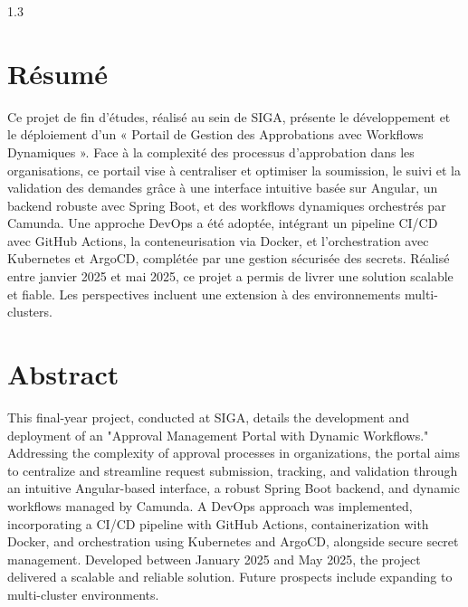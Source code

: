 \begin{samepage}
    
    \begin{spacing}{1.3}
    \vspace{-1.5cm}  %
    
    \section*{\Huge Résumé}
    
    \noindent
    \parbox{\textwidth}{
    Ce projet de fin d'études, réalisé au sein de SIGA, présente le développement et le déploiement d'un « Portail de Gestion des Approbations avec Workflows Dynamiques ». Face à la complexité des processus d'approbation dans les organisations, ce portail vise à centraliser et optimiser la soumission, le suivi et la validation des demandes grâce à une interface intuitive basée sur Angular, un backend robuste avec Spring Boot, et des workflows dynamiques orchestrés par Camunda. Une approche DevOps a été adoptée, intégrant un pipeline CI/CD avec GitHub Actions, la conteneurisation via Docker, et l'orchestration avec Kubernetes et ArgoCD, complétée par une gestion sécurisée des secrets. Réalisé entre janvier 2025 et mai 2025, ce projet a permis de livrer une solution scalable et fiable. Les perspectives incluent une extension à des environnements multi-clusters.
    }

    \vspace{1.4cm}  %
    
    \section*{\Huge Abstract}
    
    \noindent
    \parbox{\textwidth}{
    This final-year project, conducted at SIGA, details the development and deployment of an "Approval Management Portal with Dynamic Workflows." Addressing the complexity of approval processes in organizations, the portal aims to centralize and streamline request submission, tracking, and validation through an intuitive Angular-based interface, a robust Spring Boot backend, and dynamic workflows managed by Camunda. A DevOps approach was implemented, incorporating a CI/CD pipeline with GitHub Actions, containerization with Docker, and orchestration using Kubernetes and ArgoCD, alongside secure secret management. Developed between January 2025 and May 2025, the project delivered a scalable and reliable solution. Future prospects include expanding to multi-cluster environments.
    }
    \end{spacing}
    \end{samepage}
